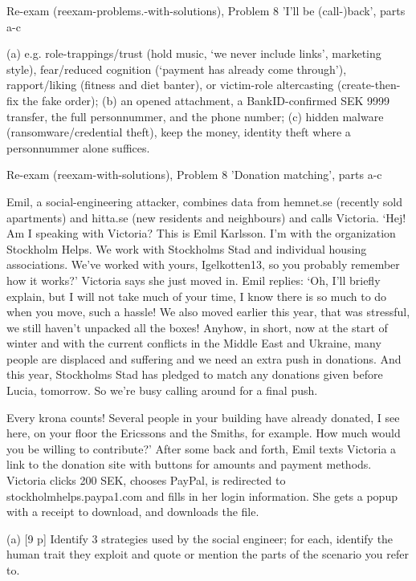 \documentclass[12pt, a4paper]{article}
\begin{document}
\begin{practicebox}{Re-exam (reexam-problems.-with-solutions), Problem 8 'I'll be (call-)back', parts a-c}
\begin{answerbox}
(a) e.g. role-trappings/trust (hold music, `we never include links', marketing style), fear/reduced cognition (`payment has already come through'), rapport/liking (fitness and diet banter), or victim-role altercasting (create-then-fix the fake order); (b) an opened attachment, a BankID-confirmed SEK 9999 transfer, the full personnummer, and the phone number; (c) hidden malware (ransomware/credential theft), keep the money, identity theft where a personnummer alone suffices.
\end{answerbox}
\end{practicebox}

\begin{practicebox}{Re-exam (reexam-with-solutions), Problem 8 'Donation matching', parts a-c}
\begin{problembox}
Emil, a social-engineering attacker, combines data from hemnet.se (recently sold apartments) and hitta.se (new residents and neighbours) and calls Victoria. `Hej! Am I speaking with Victoria? This is Emil Karlsson. I'm with the organization Stockholm Helps. We work with Stockholms Stad and individual housing associations. We've worked with yours, Igelkotten13, so you probably remember how it works?' Victoria says she just moved in. Emil replies: `Oh, I'll briefly explain, but I will not take much of your time, I know there is so much to do when you move, such a hassle! We also moved earlier this year, that was stressful, we still haven't unpacked all the boxes! Anyhow, in short, now at the start of winter and with the current conflicts in the Middle East and Ukraine, many people are displaced and suffering and we need an extra push in donations. And this year, Stockholms Stad has pledged to match any donations given before Lucia, tomorrow. So we're busy calling around for a final push.

Every krona counts! Several people in your building have already donated, I see here, on your floor the Ericssons and the Smiths, for example.
How much would you be willing to contribute?' After some back and forth, Emil texts Victoria a link to the donation site with buttons for amounts and payment methods.
Victoria clicks 200 SEK, chooses PayPal, is redirected to stockholmhelps.paypa1.com and fills in her login information.
She gets a popup with a receipt to download, and downloads the file.

(a) [9 p] Identify 3 strategies used by the social engineer; for each, identify the human trait they exploit and quote or mention the parts of the scenario you refer to.


\end{problembox}
\end{practicebox}
\end{document}
